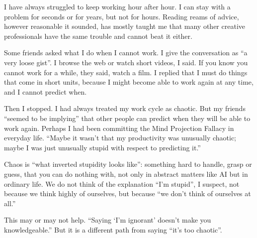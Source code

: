 
I have always struggled to keep working hour after hour. I can stay with a problem for seconds or for years, but not for hours. Reading reams of advice, however reasonable it sounded, has mostly taught me that many other creative professionals have the same trouble and cannot beat it either.

Some friends asked what I do when I cannot work. I give the conversation as ``a very loose gist''. I browse the web or watch short videos, I said. If you know you cannot work for a while, they said, watch a film. I replied that I must do things that come in short units, because I might become able to work again at any time, and I cannot predict when.

Then I stopped. I had always treated my work cycle as chaotic. But my friends ``seemed to be implying'' that other people can predict when they will be able to work again.  Perhaps I had been committing the Mind Projection Fallacy in everyday life. ``Maybe it wasn't that my productivity was unusually chaotic; maybe I was just unusually stupid with respect to predicting it.''

Chaos is ``what inverted stupidity looks like'': something hard to handle, grasp or guess, that you can do nothing with, not only in abstract matters like AI but in ordinary life. We do not think of the explanation ``I'm stupid'', I suspect, not because we think highly of ourselves, but because ``we don't think of ourselves at all.'' 

This may or may not help. ``Saying `I'm ignorant' doesn't make you knowledgeable.'' But it is a different path from saying ``it's too chaotic''.
